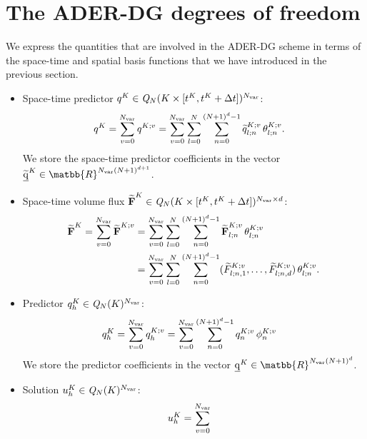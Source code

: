 \documentclass{scrreprt}
\theoremstyle{definition}
\theoremstyle{nonumberplain}
\renewcommand{\vec}[1]{{\textbf{#1}}}
\newcommand{\stvec}[1]{\widetilde{\vec{#1}}}
\newcommand{\laVec}[1]{\underline{\mathrm{#1}}}
\newcommand{\cell}{K}
\newcommand{\polyspace}[3]{\mathit{#1}_{#2}(#3)}
\begin{document}
\section{The ADER-DG degrees of freedom}
We express the quantities
that are involved in the
ADER-DG scheme in terms of
the space-time and spatial basis
functions that we have introduced in
the previous section.
\begin{itemize}
  \item Space-time predictor
  $q^\cell\in\polyspace{Q}{N}{\cell\times[t^\cell,t^\cell+\Delta
  t]}^{N_\textup{var}}$:
  \begin{align*}
  q^{\cell}
  &=
  \sum_{v=0}^{N_\textup{var}}
  q^{\cell;v}
  =
  \sum_{v=0}^{N_\textup{var}}
  \sum_{l=0}^{N}
  \sum_{n=0}^{(N+1)^{d}-1}
  \widetilde{q}^{\cell;v}_{l;n}\,
  \theta^{\cell;v}_{l;n}.
  \end{align*}
  We store the space-time predictor coefficients in the vector
  $\laVec{\widetilde{q}}^\cell\in\matbb{R}^{N_\textup{var}(N+1)^{d+1}}$.
  \item Space-time volume flux
  $\stvec{F}^{\cell}\in\polyspace{Q}{N}{\cell\times[t^\cell,t^\cell+\Delta
  t]}^{N_\textup{var}\times d}$:
  \begin{align*}
  \stvec{F}^\cell
  =
  \sum_{v=0}^{N_\textup{var}}
  \stvec{F}^{K;v}
  &=
  \sum_{v=0}^{N_\textup{var}}
  \sum_{l=0}^{N}
  \sum_{n=0}^{(N+1)^d-1}
  \stvec{F}^{K;v}_{l;n}\,{\theta}^{K;v}_{l;n} \\
  &=
  \sum_{v=0}^{N_\textup{var}}
  \sum_{l=0}^{N}
  \sum_{n=0}^{(N+1)^d-1}
  (\widetilde{F}^{K;v}_{l;n,1},\ldots,\widetilde{F}^{K;v}_{l;n,d})\,{\theta}^{K;v}_{l;n}.
  \end{align*}
  \item Predictor $q_h^{\cell}\in\polyspace{Q}{N}{\cell}^{N_\textup{var}}$:
  \begin{align*}
  q_h^{\cell}
  &=
  \sum_{v=0}^{N_\textup{var}}
  q_h^{\cell;v}
  =
  \sum_{v=0}^{N_\textup{var}}
  \sum_{n=0}^{(N+1)^{d}-1}
  q^{\cell;v}_{n}\,
  \phi^{\cell;v}_{n}
  \end{align*}	  
  We store the predictor coefficients in the vector
  $\laVec{q}^\cell\in\matbb{R}^{N_\textup{var}(N+1)^{d}}$.
  \item Solution $u_h^{\cell}\in\polyspace{Q}{N}{\cell}^{N_\textup{var}}$:
  \begin{align*}
  u_h^{\cell}
  &=
  \sum_{v=0}^{N_\textup{var}}

\end{align*}
\end{itemize}
\end{document}
